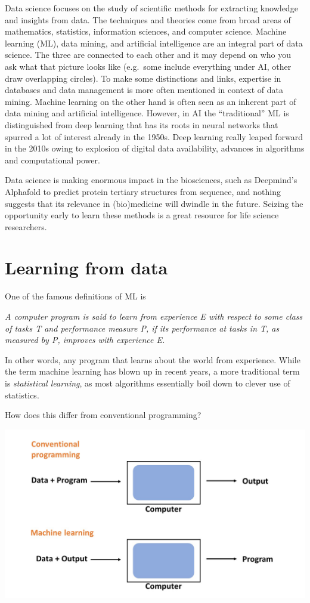 \documentclass[
]{book}
\begin{document}
Data science focuses on the study of scientific methods for extracting knowledge and insights from data. The techniques and theories come from broad areas of mathematics, statistics, information sciences, and computer science. Machine learning (ML), data mining, and artificial intelligence are an integral part of data science. The three are connected to each other and it may depend on who you ask what that picture looks like (e.g.~some include everything under AI, other draw overlapping circles). To make some distinctions and links, expertise in databases and data management is more often mentioned in context of data mining. Machine learning on the other hand is often seen as an inherent part of data mining and artificial intelligence. However, in AI the ``traditional'' ML is distinguished from deep learning that has its roots in neural networks that spurred a lot of interest already in the 1950s. Deep learning really leaped forward in the 2010s owing to explosion of digital data availability, advances in algorithms and computational power.

Data science is making enormous impact in the biosciences, such as Deepmind's Alphafold to predict protein tertiary structures from sequence, and nothing suggests that its relevance in (bio)medicine will dwindle in the future. Seizing the opportunity early to learn these methods is a great resource for life science researchers.

\hypertarget{learning-from-data}{%
\section{Learning from data}\label{learning-from-data}}

One of the famous definitions of ML is

\emph{A computer program is said to learn from experience E with respect to some class of tasks T and performance measure P, if its performance at tasks in T, as measured by P, improves with experience E.}

In other words, any program that learns about the world from experience. While the term machine learning has blown up in recent years, a more traditional term is \emph{statistical learning}, as most algorithms essentially boil down to clever use of statistics.

How does this differ from conventional programming?

\includegraphics{assets/ml_vs_programming.jpg}
\end{document}

